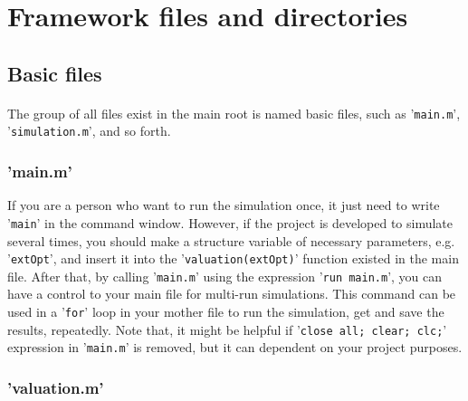 \section{Framework files and directories} {
	\subsection{Basic files} {
		\paragraph{} {
			The group of all files exist in the main root is named basic files, such as '\texttt{main.m}', '\texttt{simulation.m}', and so forth.
		}

		\subsubsection{'main.m'} {
			If you are a person who want to run the simulation once, it just need to write '\texttt{main}' in the command window.
			However, if the project is developed to simulate several times, you should make a structure variable of necessary parameters, e.g. '\texttt{extOpt}', and insert it into the '\texttt{valuation(extOpt)}' function existed in the main file.
			After that, by calling '\texttt{main.m}' using the expression '\texttt{run main.m}', you can have a control to your main file for multi-run simulations.
			This command can be used in a '\texttt{for}' loop in your mother file to run the simulation, get and save the results, repeatedly.
			Note that, it might be helpful if '\texttt{close all; clear; clc;}' expression in '\texttt{main.m}' is removed, but it can dependent on your project purposes.
		}

		\subsubsection{'valuation.m'} {
}}}
